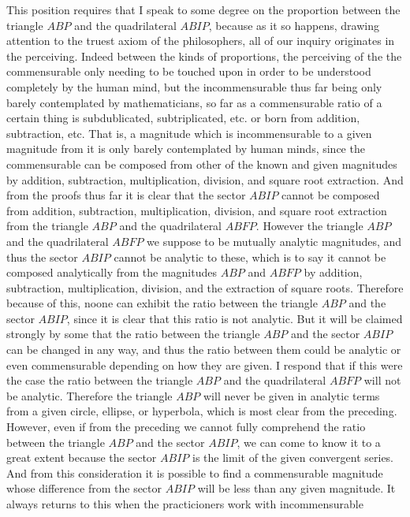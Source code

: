 \documentclass[11pt,letterpaper]{book}
\begin{document}
\begin{samepage}
This position requires that I speak to some degree on the proportion between
the triangle $ABP$ and the quadrilateral $ABIP$, because as it so happens,
drawing attention to the truest axiom of the philosophers, all of
our inquiry originates in the perceiving.
Indeed between the kinds of proportions, the perceiving of the the commensurable
only needing to be touched upon in order to be understood completely by the
human mind, but the incommensurable thus far being only barely contemplated by
mathematicians, so far as a commensurable ratio of a certain thing is
subdublicated, subtriplicated, etc. or born from addition, subtraction, etc.
That is, a magnitude which is incommensurable to a given magnitude from it is
only barely contemplated by human minds, since the commensurable can be composed
from other of the known and given magnitudes by addition, subtraction,
multiplication, division, and square root extraction.
And from the proofs thus far it is clear that the sector $ABIP$ cannot be
composed from addition, subtraction, multiplication, division, and square root
extraction from the triangle $ABP$ and the quadrilateral $ABFP$.
However the triangle $ABP$ and the quadrilateral $ABFP$ we suppose to be
mutually analytic magnitudes, and thus the sector $ABIP$ cannot be analytic to
these, which is to say it cannot be composed analytically from the magnitudes
$ABP$ and $ABFP$ by addition, subtraction, multiplication, division, and the
extraction of square roots.
Therefore because of this, noone can exhibit the ratio between the
triangle $ABP$ and the sector $ABIP$, since it is clear that this ratio is not
analytic.
But it will be claimed strongly by some that the ratio between the triangle
$ABP$ and the sector $ABIP$ can be changed in any way, and thus the ratio
between them could be analytic or even commensurable depending on how they are
given.
I respond that if this were the case the ratio between the triangle $ABP$ and
the quadrilateral $ABFP$ will not be analytic.
Therefore the triangle $ABP$ will never be given in analytic terms from a given
circle, ellipse, or hyperbola, which is most clear from the preceding.
However, even if from the preceding we cannot fully comprehend the ratio between
the triangle $ABP$ and the sector $ABIP$, we can come to know it to a great
extent because the sector $ABIP$ is the limit of the given convergent series.
And from this consideration it is possible to find a commensurable magnitude
whose difference from the sector $ABIP$ will be less than any
given magnitude.
It always returns to this when the practicioners work with incommensurable

\end{samepage}
\end{document}
